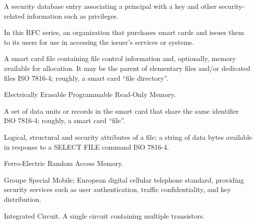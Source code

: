 \begin{htmllist}

 \item[Account]
 
 A security database entry associating a principal with a key and other
 security-related information such as privileges.

 \item[Issuer]
 
 In this RFC series, an organization that purchases smart cards and issues
 them to its users for use in accessing the issuer's services or systems.

 \item[Dedicated file]
 
 A smart card file containing file control information and, optionally,
 memory available for allocation. It may be the parent of elementary files
 and/or dedicated files ISO 7816-4; roughly, a smart card ``file
 directory''.

 \item[EEPROM]

 Electrically Erasable Programmable Read-Only Memory.

 \item[Elementary file]
 
 A set of data units or records in the smart card that share the same
 identifier ISO 7816-4; roughly, a smart card ``file''.

 \item[File control information (FCI)]
 
 Logical, structural and security attributes of a file; a string of data
 bytes available in response to a SELECT FILE command ISO 7816-4.

 \item[FRAM]

 Ferro-Electric Random Access Memory.

 \item[GSM]
 
 Groupe Special Mobile; European digital cellular telephone standard,
 providing security services such as user authentication, traffic
 confidentiality, and key distribution.

 \item[IC]
 
 Integrated Circuit. A single circuit containing multiple transistors.

 \item[Interactive principal]


\end{htmllist}
